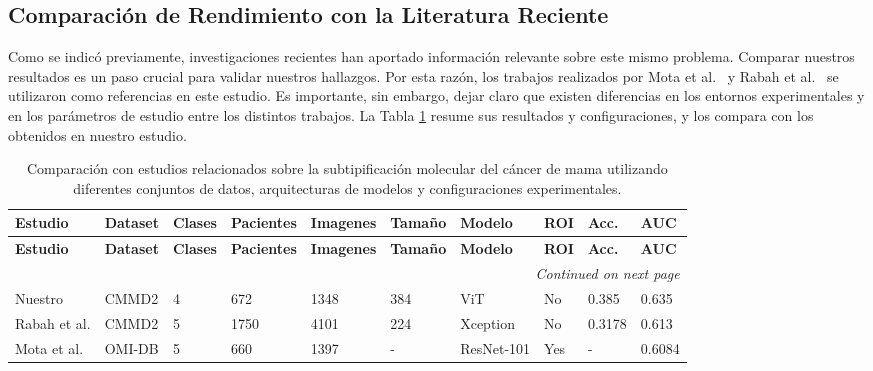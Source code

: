 \documentclass[a4paper,10pt]{book}
\begin{document}
\subsection{Comparación de Rendimiento con la Literatura Reciente}

Como se indicó previamente, investigaciones recientes han aportado información relevante sobre este mismo problema. Comparar nuestros resultados es un paso crucial para validar nuestros hallazgos. Por esta razón, los trabajos realizados por Mota et al.\ \cite{mota_breast_2024} y Rabah et al.\ \cite{ben_rabah_multimodal_2025} se utilizaron como referencias en este estudio. Es importante, sin embargo, dejar claro que existen diferencias en los entornos experimentales y en los parámetros de estudio entre los distintos trabajos. La Tabla \ref{tab:studies_comparison} resume sus resultados y configuraciones, y los compara con los obtenidos en nuestro estudio.

\begin{scriptsize}
\begin{longtable}{@{}l l l l l l l l l l@{}}
\caption[Comparación con estudios relacionados]{Comparación con estudios relacionados sobre la subtipificación molecular del cáncer de mama utilizando diferentes conjuntos de datos, arquitecturas de modelos y configuraciones experimentales.}
\label{tab:studies_comparison} \\
\toprule
\textbf{Estudio} & \textbf{Dataset} & \textbf{Clases} & \textbf{Pacientes} & \textbf{Imagenes} &  \textbf{Tamaño} & \textbf{Modelo}  & \textbf{ROI} & \textbf{Acc.}  & \textbf{AUC}\\
\midrule
\endfirsthead

\toprule
\textbf{Estudio} & \textbf{Dataset} & \textbf{Clases} & \textbf{Pacientes} & \textbf{Imagenes} &  \textbf{Tamaño} & \textbf{Modelo}  & \textbf{ROI} & \textbf{Acc.}  & \textbf{AUC}\\
\midrule
\endhead

\midrule
\multicolumn{10}{r}{\textit{Continued on next page}}\\
\midrule
\endfoot

\bottomrule
\endlastfoot
        Nuestro & CMMD2 & 4  & 672 & 1348 & 384 &  ViT & No & 0.385 & 0.635 \\
        Rabah et al. \cite{ben_rabah_multimodal_2025} & CMMD2 & 5 & 1750  & 4101  & 224 & Xception & No & 0.3178 & 0.613 \\
        Mota et al. \cite{mota_breast_2024} & OMI-DB & 5  & 660 & 1397 & - & ResNet-101 & Yes & - & 0.6084 \\
\end{longtable}
\end{scriptsize}
\end{document}
